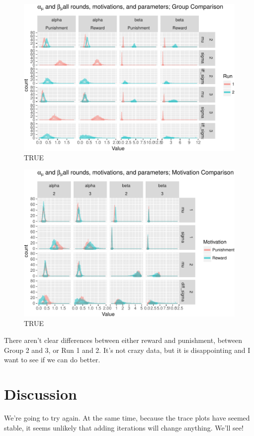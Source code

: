 \documentclass[]{article}
\begin{document}
\begin{figure}[htbp]
\centering
\includegraphics{compare_vb_and_MCMC_files/figure-latex/MCMCresultsRunComparison-1.pdf}
\caption{TRUE}
\end{figure}

\begin{figure}[htbp]
\centering
\includegraphics{compare_vb_and_MCMC_files/figure-latex/MCMCresultsMotivationComparison-1.pdf}
\caption{TRUE}
\end{figure}

There aren't clear differences between either reward and punishment,
between Group 2 and 3, or Run 1 and 2. It's not crazy data, but it is
disappointing and I want to see if we can do better.

\section{Discussion}\label{discussion}

We're going to try again. At the same time, because the trace plots have
seemed stable, it seems unlikely that adding iterations will change
anything. We'll see!
\end{document}
